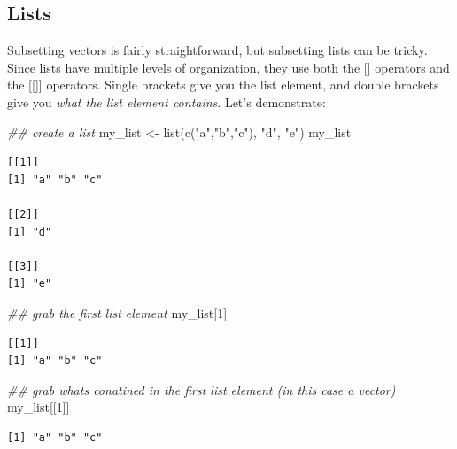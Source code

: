 \documentclass[
  letterpaper,
  DIV=11,
  numbers=noendperiod]{scrreprt}
\newenvironment{Shaded}{\begin{snugshade}}{\end{snugshade}}
\newcommand{\DecValTok}[1]{\textcolor[rgb]{0.68,0.00,0.00}{#1}}
\newcommand{\DocumentationTok}[1]{\textcolor[rgb]{0.37,0.37,0.37}{\textit{#1}}}
\newcommand{\FunctionTok}[1]{\textcolor[rgb]{0.28,0.35,0.67}{#1}}
\newcommand{\NormalTok}[1]{\textcolor[rgb]{0.00,0.23,0.31}{#1}}
\newcommand{\OtherTok}[1]{\textcolor[rgb]{0.00,0.23,0.31}{#1}}
\newcommand{\StringTok}[1]{\textcolor[rgb]{0.13,0.47,0.30}{#1}}
\begin{document}
\hypertarget{lists}{%
\subsection{Lists}\label{lists}}

Subsetting vectors is fairly straightforward, but subsetting lists can
be tricky. Since lists have multiple levels of organization, they use
both the {[}{]} operators and the {[}{[}{]}{]} operators. Single
brackets give you the list element, and double brackets give you
\emph{what the list element contains}. Let's demonstrate:

\begin{Shaded}
\begin{Highlighting}[]
\DocumentationTok{\#\# create a list }
\NormalTok{my\_list }\OtherTok{\textless{}{-}} \FunctionTok{list}\NormalTok{(}\FunctionTok{c}\NormalTok{(}\StringTok{"a"}\NormalTok{,}\StringTok{"b"}\NormalTok{,}\StringTok{"c"}\NormalTok{), }\StringTok{"d"}\NormalTok{, }\StringTok{"e"}\NormalTok{)}
\NormalTok{my\_list}
\end{Highlighting}
\end{Shaded}

\begin{verbatim}
[[1]]
[1] "a" "b" "c"

[[2]]
[1] "d"

[[3]]
[1] "e"
\end{verbatim}

\begin{Shaded}
\begin{Highlighting}[]
\DocumentationTok{\#\# grab the first list element}
\NormalTok{my\_list[}\DecValTok{1}\NormalTok{]}
\end{Highlighting}
\end{Shaded}

\begin{verbatim}
[[1]]
[1] "a" "b" "c"
\end{verbatim}

\begin{Shaded}
\begin{Highlighting}[]
\DocumentationTok{\#\# grab what\textquotesingle{}s conatined in the first list element (in this case a vector)}
\NormalTok{my\_list[[}\DecValTok{1}\NormalTok{]]}
\end{Highlighting}
\end{Shaded}

\begin{verbatim}
[1] "a" "b" "c"
\end{verbatim}
\end{document}
